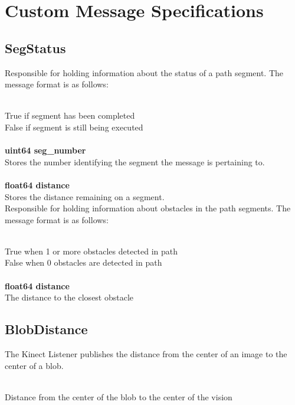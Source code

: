 
\section{Custom Message Specifications}

\subsection{SegStatus}

Responsible for holding information about the status of a path
segment.  The message format is as follows:

\\
\indent True if segment has been completed\\
\indent False if segment is still being executed\\
\\
{\bf uint64 seg\_number}\\
\indent Stores the number identifying the segment the message is
pertaining to.\\
\\
{\bf float64 distance}\\
\indent Stores the distance remaining on a segment.\\


Responsible for holding information about obstacles in the path
segments.  The message format is as follows:

\\
\indent True when 1 or more obstacles detected in path\\
\indent False when 0 obstacles are detected in path\\
\\
{\bf float64 distance}\\
\indent The distance to the closest obstacle

\subsection{BlobDistance}
The Kinect Listener publishes the distance from the center of an image
to the center of a blob.

\\
\indent Distance from the center of the blob to the center of the vision\\

